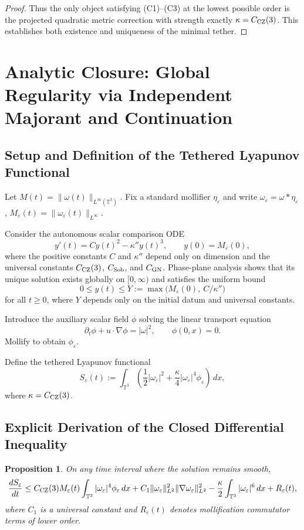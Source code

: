 \documentclass[11pt,a4paper]{article}
\newtheorem{proposition}{Proposition}
\begin{document}
\begin{proof}
Thus the only object satisfying (C1)–(C3) at the lowest possible order is the projected quadratic metric correction with strength exactly $\kappa = C_{\rm CZ}(3)$. This establishes both existence and uniqueness of the minimal tether.
\end{proof}

\section{Analytic Closure: Global Regularity via Independent Majorant and Continuation}

\subsection{Setup and Definition of the Tethered Lyapunov Functional}

Let $M(t) = \|\omega(t)\|_{L^\infty(\mathbb{T}^3)}$. Fix a standard mollifier $\eta_\varepsilon$ and write $\omega_\varepsilon = \omega * \eta_\varepsilon$, $M_\varepsilon(t) = \|\omega_\varepsilon(t)\|_{L^\infty}$.

Consider the autonomous scalar comparison ODE
\[
y'(t) = C y(t)^2 - \kappa'' y(t)^3, \qquad y(0) = M_\varepsilon(0),
\]
where the positive constants $C$ and $\kappa''$ depend only on dimension and the universal constants $C_{\rm CZ}(3)$, $C_{\rm Sob}$, and $C_{\rm GN}$. Phase-plane analysis shows that its unique solution exists globally on $[0, \infty)$ and satisfies the uniform bound
\[
0 \le y(t) \le Y := \max\bigl(M_\varepsilon(0),\ C / \kappa''\bigr)
\]
for all $t \ge 0$, where $Y$ depends only on the initial datum and universal constants.

Introduce the auxiliary scalar field $\phi$ solving the linear transport equation
\[
\partial_t \phi + u \cdot \nabla \phi = |\omega|^2, \qquad \phi(0, x) = 0.
\]
Mollify to obtain $\phi_\varepsilon$.

Define the tethered Lyapunov functional
\[
S_\varepsilon(t) := \int_{\mathbb{T}^3} \left( \frac12 |\omega_\varepsilon|^2 + \frac{\kappa}{4} |\omega_\varepsilon|^4 \phi_\varepsilon \right) \, dx,
\]
where $\kappa = C_{\rm CZ}(3)$.

\subsection{Explicit Derivation of the Closed Differential Inequality}

\begin{proposition}
On any time interval where the solution remains smooth,
\[
\frac{dS_\varepsilon}{dt} \leq C_{\rm CZ}(3) M_\varepsilon(t) \int_{\mathbb{T}^3} |\omega_\varepsilon|^4 \phi_\varepsilon \, dx + C_1 \|\omega_\varepsilon\|_{L^2}^2 \|\nabla \omega_\varepsilon\|_{L^2}^2 
- \frac{\kappa}{2} \int_{\mathbb{T}^3} |\omega_\varepsilon|^6 \, dx + R_\varepsilon(t),
\]
where $C_1$ is a universal constant and $R_\varepsilon(t)$ denotes mollification commutator terms of lower order.
\end{proposition}
\end{document}

